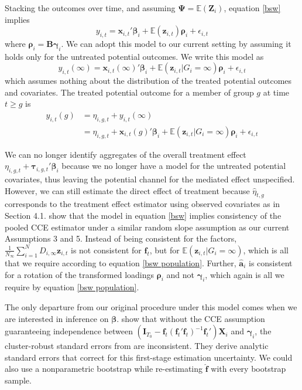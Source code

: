 \documentclass[12pt,fleqn]{article}
\def\*#1{\mathbf{#1}}
\def\+#1{\boldsymbol{#1}}
\begin{document}
Stacking the outcomes over time, and assuming $\+\Psi = \mathbb{E}(\*Z_i)$, equation \eqref{bsw} implies 
\begin{equation}\label{bsw population}
    y_{i,t} = \*x_{i,t}' \+\beta_i + \mathbb{E}(\*z_{i,t})\+\rho_i + \epsilon_{i,t}
\end{equation}
where $\+\rho_i = \*B \+\gamma_i$. We can adopt this model to our current setting by assuming it holds only for the untreated potential outcomes. We write this model as
\begin{equation}
    y_{i,t}(\infty) = \*x_{i,t}(\infty)' \+\beta_i + \mathbb{E}(\*z_{i,t} | G_i = \infty) \+\rho_i + \epsilon_{i,t}
\end{equation}
which assumes nothing about the distribution of the treated potential outcomes and covariates. The treated potential outcome for a member of group $g$ at time $t \geq g$ is
\begin{align*}
    y_{i,t}(g) 
    &= \eta_{i,g,t} + y_{i,t}(\infty)\\
    &= \eta_{i,g,t} + \*x_{i,t}(g)' \+\beta_i + \mathbb{E}(\*z_{i,t} | G_i = \infty) \+\rho_i + \epsilon_{i,t}
\end{align*}

We can no longer identify aggregates of the overall treatment effect $\eta_{i,g,t} + \+\tau_{i,g,t}' \+\beta_i$ because we no longer have a model for the untreated potential covariates, thus leaving the potential channel for the mediated effect unspecified. However, we can still estimate the direct effect of treatment because $\widehat{\eta}_{t,g}$ corresponds to the treatment effect estimator using observed covariates as in Section 4.1. \citet{Brown_Schmidt_Wooldridge_2021} show that the model in equation \eqref{bsw} implies consistency of the pooled CCE estimator under a similar random slope assumption as our current Assumptions 3 and 5. Instead of being consistent for the factors, $\frac{1}{N_\infty} \sum_{i = 1}^N D_{i,\infty} \*z_{i,t}$ is not consistent for $\*f_t$, but for $\mathbb{E}(\*z_{i,t}|G_i = \infty)$, which is all that we require according to equation \eqref{bsw population}. Further, $\widehat{\*a}_i$ is consistent for a rotation of the transformed loadings $\+\rho_i$ and not $\+\gamma_i$, which again is all we require by equation \eqref{bsw population}.

The only departure from our original procedure under this model comes when we are interested in inference on $\+\beta$. \citet{Brown_Schmidt_Wooldridge_2021} show that without the CCE assumption guaranteeing independence between $(\*I_{T_0} - \*f_t (\*f_t' \*f_t)^{-1} \*f_t') \*X_i$ and $\+\gamma_i$, the cluster-robust standard errors from \citet{westerlund2019cce} are inconsistent. They derive analytic standard errors that correct for this first-stage estimation uncertainty. We could also use a nonparametric bootstrap while re-estimating $\widehat{\*f}$ with every bootstrap sample.
\end{document}
